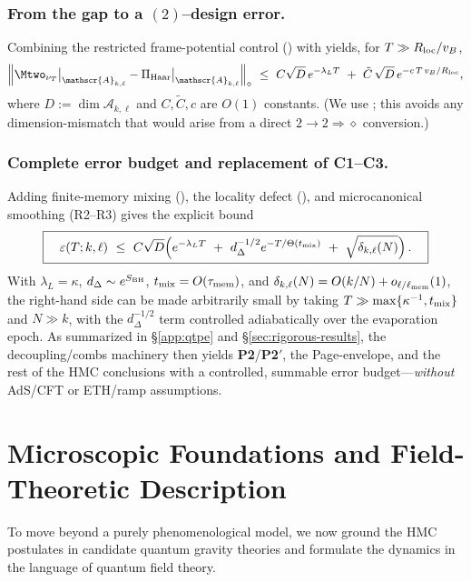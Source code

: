 \documentclass[aps,prd,preprint,onecolumn,superscriptaddress,nofootinbib,longbibliography,floatfix,11pt,showpacs,showkeys]{revtex4-2}
\newcommand{\Ptwo}{\textbf{P2}\xspace}
\newcommand{\PtwoPrime}{\textbf{P2$'$}\xspace}
\newcommand{\HMC}{\textsc{HMC}\xspace}
\theoremstyle{plain}
\theoremstyle{definition}
\theoremstyle{remark}
\begin{document}
\subsubsection{From the gap to a $(2)$--design error.}
Combining the restricted frame-potential control () with  yields, for $T\gg R_{\rm loc}/v_B$,
\begin{equation}
\label{eq:design-2-eh}
\Big\| \Mtwo_{\nu_T}\big|_{\mathscr{A}_{k,\ell}} - \Pi_{\rm Haar}\big|_{\mathscr{A}_{k,\ell}} \Big\|_{\diamond}
\ \le\ C\sqrt{D}\,e^{-\lambda_L T}\ +\ \tilde C\,\sqrt{D}\,e^{-c\, T\, v_B/R_{\rm loc}},
\end{equation}
where $D:=\dim\mathscr{A}_{k,\ell}$ and $C,\tilde C,c$ are $O(1)$ constants.  (We use ; this avoids any dimension-mismatch that would arise from a direct $2{\to}2\Rightarrow \diamond$ conversion.)

\subsubsection{Complete error budget and replacement of C1--C3.}
Adding finite-memory mixing (), the locality defect (), and microcanonical smoothing (R2--R3) gives the explicit bound
\begin{equation}
\label{eq:epsilon-budget-final}
\boxed{\quad
\varepsilon(T;k,\ell)\ \le\ C\sqrt{D}\Big(e^{-\lambda_L T}\ +\ d_\Delta^{-1/2} e^{-T/\Theta(t_{\rm mix})}\ +\ \sqrt{\delta_{k,\ell}(N)}\Big)\,.
\quad}
\end{equation}
With $\lambda_L=\kappa$, $d_\Delta\sim e^{S_{\rm BH}}$, $t_{\rm mix}=O(\tau_{\rm mem})$, and $\delta_{k,\ell}(N)=O(k/N)+o_{\ell/\ell_{\rm mem}}(1)$, the right-hand side can be made arbitrarily small by taking $T\gg \max\{\kappa^{-1},t_{\rm mix}\}$ and $N\gg k$, with the $d_\Delta^{-1/2}$ term controlled adiabatically over the evaporation epoch.
As summarized in \S\ref{app:qtpe} and \S\ref{sec:rigorous-results}, the decoupling/combs machinery then yields \Ptwo/\PtwoPrime, the Page-envelope, and the rest of the HMC conclusions with a controlled, summable error budget---\emph{without} AdS/CFT or ETH/ramp assumptions.

\section{Microscopic Foundations and Field-Theoretic Description}\label{sec:microscopic_foundations}\label{sec:microscopic}
To move beyond a purely phenomenological model, we now ground the \HMC{} postulates in candidate quantum gravity theories and formulate the dynamics in the language of quantum field theory.
\end{document}
